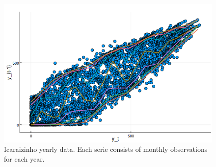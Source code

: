 \begin{figure}[h]
	\centering
		\includegraphics[width=0.8\linewidth]{Figuras/npqar-solar/com-divisao-lambda100.png}
	\caption{Icaraizinho yearly data. Each serie consists of monthly observations for each year.}
	\label{fig:npqar-solar-tubarao}
\end{figure}
